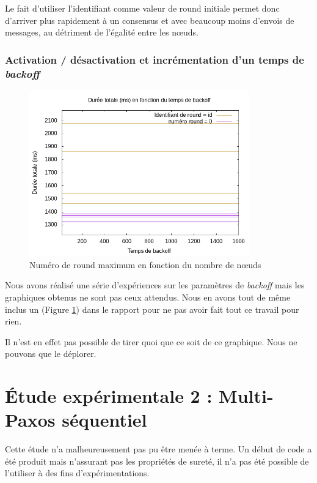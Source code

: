 \documentclass[french]{article}
\begin{document}
Le fait d'utiliser l'identifiant comme valeur de round initiale permet donc d'arriver plus rapidement à un consensus et avec beaucoup moins d'envois de messages,
au détriment de l'égalité entre les nœuds.


\subsubsection{Activation / désactivation et incrémentation d'un temps de \emph{backoff}}

\begin{figure}[h]
	\centering
	\includegraphics[width=0.85\textwidth]{BackoffMessages.png} %
	\caption{Numéro de round maximum en fonction du nombre de nœuds}
	\label{fig:backoff-duration-node}
\end{figure}


Nous avons réalisé une série d'expériences sur les paramètres de \emph{backoff} mais les graphiques obtenus ne sont pas ceux attendus.
Nous en avons tout de même inclus un (Figure \ref{fig:backoff-duration-node}) dans le rapport pour ne pas avoir fait tout ce travail pour rien.

Il n'est en effet pas possible de tirer quoi que ce soit de ce graphique.
Nous ne pouvons que le déplorer.



\section{Étude expérimentale 2 : Multi-Paxos séquentiel}

Cette étude n'a malheureusement pas pu être menée à terme.
Un début de code a été produit mais n'assurant pas les propriétés de sureté, il n'a pas été possible de l'utiliser à des fins d'expérimentations.
\end{document}
